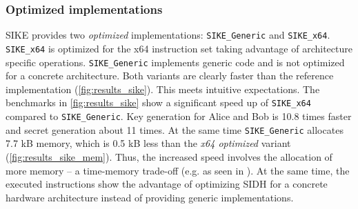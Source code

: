 \subsubsection{Optimized implementations}
\gls{SIKE} provides two \textit{optimized} implementations: \texttt{SIKE\_Generic} and \texttt{SIKE\_x64}. \texttt{SIKE\_x64} is optimized for the x64 instruction set taking advantage of architecture specific operations. \texttt{SIKE\_Generic} implements generic code and is not optimized for a concrete architecture.
Both variants are clearly faster than the reference implementation (\autoref{fig:results_sike}). This meets intuitive expectations. The benchmarks in \autoref{fig:results_sike} show a significant speed up of \texttt{SIKE\_x64} compared to \texttt{SIKE\_Generic}. Key generation for Alice and Bob is 10.8 times faster and secret generation about 11 times. At the same time \texttt{SIKE\_Generic} allocates 7.7 \gls{kB} memory, which is 0.5 \gls{kB} less than the \textit{x64 optimized} variant (\autoref{fig:results_sike_mem}). 
Thus, the increased speed involves the allocation of more memory -- a time-memory trade-off (e.g. as seen in \parencite{1056220}). At the same time, the executed instructions show the advantage of optimizing \gls{SIDH} for a concrete hardware architecture instead of providing generic implementations.

